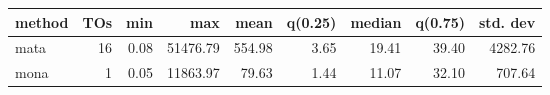 \begin{tabular}{lrrrrrrrr}
\hline
 method   &   TOs &   min &      max &   mean &   q(0.25) &   median &   q(0.75) &   std. dev \\
\hline
 mata     & 16 &  0.08 & 51476.79 & 554.98 &      3.65 &    19.41 &     39.40 &    4282.76 \\
 mona     &  1 &  0.05 & 11863.97 &  79.63 &      1.44 &    11.07 &     32.10 &     707.64 \\
\hline
\end{tabular}
